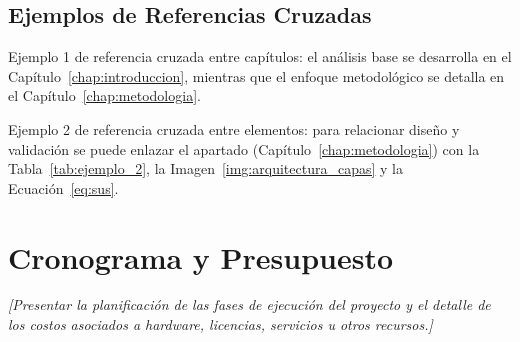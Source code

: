 \subsection{Ejemplos de Referencias Cruzadas}
Ejemplo 1 de referencia cruzada entre capítulos: el análisis base se desarrolla en el Capítulo~\ref{chap:introduccion}, mientras que el enfoque metodológico se detalla en el Capítulo~\ref{chap:metodologia}.

Ejemplo 2 de referencia cruzada entre elementos: para relacionar diseño y validación se puede enlazar el apartado \emph{} (Capítulo~\ref{chap:metodologia}) con la Tabla~\ref{tab:ejemplo_2}, la Imagen~\ref{img:arquitectura_capas} y la Ecuación~\ref{eq:sus}.

\section{Cronograma y Presupuesto}
\textit{[Presentar la planificación de las fases de ejecución del proyecto y el detalle de los costos asociados a hardware, licencias, servicios u otros recursos.]}
